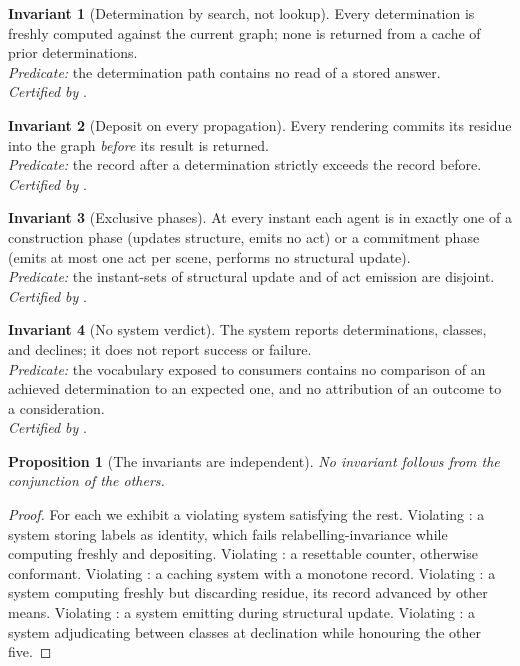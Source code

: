 \documentclass[11pt,a4paper]{article}
\theoremstyle{clstyle}
\newtheorem{proposition}[theorem]{Proposition}
\theoremstyle{definition}
\newtheorem{binv}{Invariant}
\theoremstyle{remark}
\begin{document}
\begin{binv}[Determination by search, not lookup]
\label{inv:search}
Every determination is freshly computed against the current graph; none is
returned from a cache of prior determinations.\\
\emph{Predicate:} the determination path contains no read of a stored answer.\\
\emph{Certified by} .
\end{binv}

\begin{binv}[Deposit on every propagation]
\label{inv:deposit}
Every rendering commits its residue into the graph \emph{before} its result
is returned.\\
\emph{Predicate:} the record after a determination strictly exceeds the
record before.\\
\emph{Certified by} .
\end{binv}

\begin{binv}[Exclusive phases]
\label{inv:phase}
At every instant each agent is in exactly one of a construction phase
(updates structure, emits no act) or a commitment phase (emits at most one
act per scene, performs no structural update).\\
\emph{Predicate:} the instant-sets of structural update and of act emission
are disjoint.\\
\emph{Certified by} .
\end{binv}

\begin{binv}[No system verdict]
\label{inv:no-verdict}
The system reports determinations, classes, and declines; it does not report
success or failure.\\
\emph{Predicate:} the vocabulary exposed to consumers contains no comparison
of an achieved determination to an expected one, and no attribution of an
outcome to a consideration.\\
\emph{Certified by} .
\end{binv}

\begin{proposition}[The invariants are independent]
\label{prop:invariants-independent}
No invariant follows from the conjunction of the others.
\end{proposition}

\begin{proof}
For each we exhibit a violating system satisfying the rest. Violating
: a system storing labels as identity, which fails
relabelling-invariance while computing freshly and depositing. Violating
: a resettable counter, otherwise conformant. Violating
: a caching system with a monotone record. Violating
: a system computing freshly but discarding residue, its
record advanced by other means. Violating : a system emitting
during structural update. Violating : a system
adjudicating between classes at declination while honouring the other five.
\end{proof}
\end{document}
